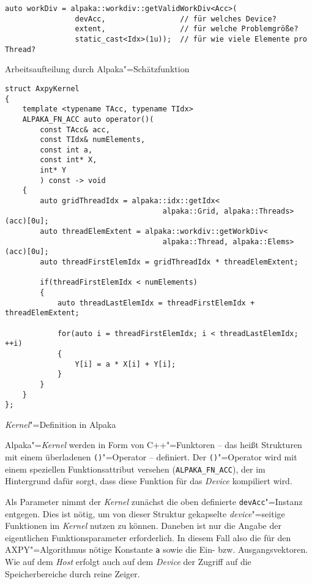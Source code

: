 \begin{code}
    \begin{verbatim}
auto workDiv = alpaka::workdiv::getValidWorkDiv<Acc>(
                devAcc,                 // für welches Device?
                extent,                 // für welche Problemgröße?
                static_cast<Idx>(1u));  // für wie viele Elemente pro Thread?
    \end{verbatim}
    \caption{Arbeitsaufteilung durch Alpaka"=Schätzfunktion}
    \label{alpaka:ueberblick:axpy:kernel:workdiv}
\end{code}

\begin{code}
    \begin{verbatim}
struct AxpyKernel
{
    template <typename TAcc, typename TIdx>
    ALPAKA_FN_ACC auto operator()(
        const TAcc& acc,
        const TIdx& numElements,
        const int a,
        const int* X,
        int* Y
        ) const -> void
    {
        auto gridThreadIdx = alpaka::idx::getIdx<
                                    alpaka::Grid, alpaka::Threads>(acc)[0u];
        auto threadElemExtent = alpaka::workdiv::getWorkDiv<
                                    alpaka::Thread, alpaka::Elems>(acc)[0u];
        auto threadFirstElemIdx = gridThreadIdx * threadElemExtent;

        if(threadFirstElemIdx < numElements)
        {
            auto threadLastElemIdx = threadFirstElemIdx + threadElemExtent;
            
            for(auto i = threadFirstElemIdx; i < threadLastElemIdx; ++i)
            {
                Y[i] = a * X[i] + Y[i];
            }
        }
    }
};
    \end{verbatim}
    \caption{\textit{Kernel}"=Definition in Alpaka}
    \label{alpaka:ueberblick:axpy:kernel:kernel_src}
\end{code}
\vspace{3mm}
Alpaka"=\textit{Kernel} werden in Form von C++"=Funktoren -- das heißt
Strukturen mit einem überladenen \texttt{()}"=Operator -- definiert. Der
\texttt{()}"=Operator wird mit einem speziellen Funktionsattribut versehen
(\texttt{ALPAKA\_FN\_ACC}), der im Hintergrund dafür sorgt, dass diese Funktion
für das \textit{Device} kompiliert wird.

Als Parameter nimmt der \textit{Kernel} zunächst die oben definierte
\texttt{devAcc}"=Instanz entgegen. Dies ist nötig, um von dieser Struktur
gekapselte \textit{device}"=seitige Funktionen im \textit{Kernel} nutzen zu
können. Daneben ist nur die Angabe der eigentlichen Funktionsparameter
erforderlich. In diesem Fall also die für den AXPY"=Algorithmus nötige Konstante
\texttt{a} sowie die Ein- bzw. Ausgangsvektoren. Wie auf dem \textit{Host}
erfolgt auch auf dem \textit{Device} der Zugriff auf die Speicherbereiche durch
reine Zeiger.


